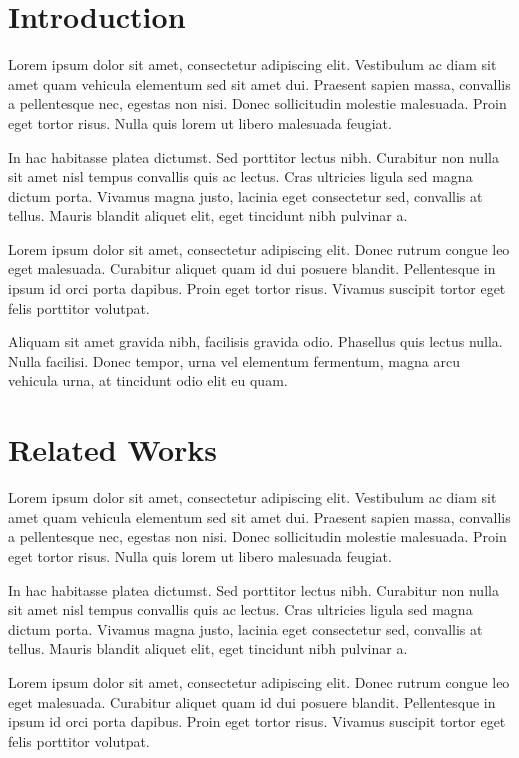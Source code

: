 \documentclass[12pt,twocolumn]{article}
\begin{document}
\section{Introduction}

Lorem ipsum dolor sit amet, consectetur adipiscing elit. Vestibulum ac diam sit amet quam vehicula elementum sed sit amet dui. Praesent sapien massa, convallis a pellentesque nec, egestas non nisi. Donec sollicitudin molestie malesuada. Proin eget tortor risus. Nulla quis lorem ut libero malesuada feugiat.

In hac habitasse platea dictumst. Sed porttitor lectus nibh. Curabitur non nulla sit amet nisl tempus convallis quis ac lectus. Cras ultricies ligula sed magna dictum porta. Vivamus magna justo, lacinia eget consectetur sed, convallis at tellus. Mauris blandit aliquet \citet{he2016deep} elit, eget tincidunt nibh pulvinar a.

Lorem ipsum dolor sit amet, consectetur adipiscing elit. Donec rutrum congue leo eget malesuada. Curabitur aliquet quam id dui posuere blandit. Pellentesque in ipsum id orci porta dapibus. Proin eget tortor risus. Vivamus suscipit tortor eget felis porttitor volutpat.

Aliquam sit amet gravida nibh, facilisis gravida odio. Phasellus quis lectus nulla. Nulla facilisi. Donec tempor, urna vel elementum fermentum, magna arcu vehicula urna, at tincidunt odio elit eu quam.

\section{Related Works}

Lorem ipsum dolor sit amet, consectetur adipiscing elit. Vestibulum ac diam sit amet quam vehicula elementum sed sit amet dui. Praesent sapien massa, convallis a pellentesque nec, egestas non nisi. Donec sollicitudin molestie malesuada. Proin eget tortor risus. Nulla quis lorem ut libero malesuada feugiat.

In hac habitasse platea dictumst. Sed porttitor lectus nibh. Curabitur non nulla sit amet nisl tempus convallis quis ac lectus. Cras ultricies ligula sed magna dictum porta. Vivamus magna justo, lacinia eget consectetur sed, convallis at tellus. Mauris blandit aliquet elit, eget tincidunt nibh pulvinar a.

Lorem ipsum dolor sit amet, consectetur adipiscing elit. Donec rutrum congue leo eget malesuada. Curabitur aliquet quam id dui posuere blandit. Pellentesque in ipsum id orci porta dapibus. Proin eget tortor risus. Vivamus suscipit tortor eget felis porttitor volutpat.
\end{document}
